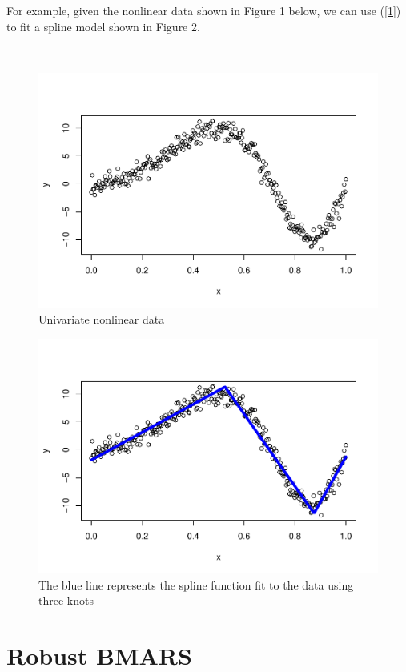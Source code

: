 \documentclass[
]{article}
\begin{document}
For example, given the nonlinear data shown in Figure 1 below, we can
use (\ref{1}) to fit a spline model shown in Figure 2.

~

\begin{figure}
\centering
\includegraphics{TBASS_vig_files/figure-latex/unnamed-chunk-4-1.pdf}
\caption{Univariate nonlinear data}
\end{figure}

\begin{figure}
\centering
\includegraphics{TBASS_vig_files/figure-latex/unnamed-chunk-5-1.pdf}
\caption{The blue line represents the spline function fit to the data
using three knots}
\end{figure}

\pagebreak

\hypertarget{robust-bmars}{%
\section{Robust BMARS}\label{robust-bmars}}
\end{document}
